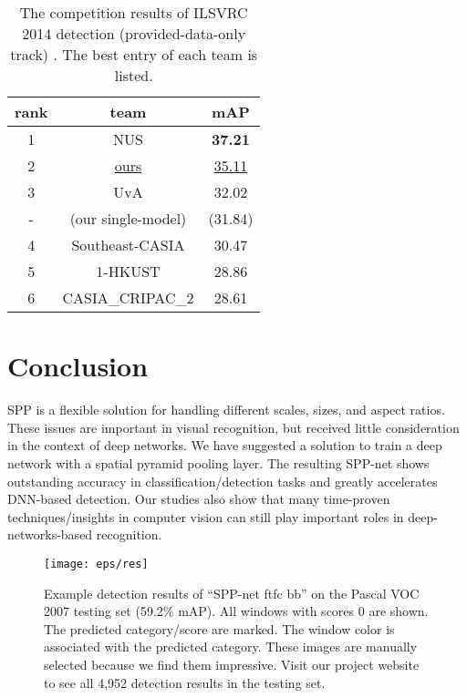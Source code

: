 \documentclass[10pt,journal,cspaper,compsoc]{IEEEtran}
\begin{document}
\setlength{\tabcolsep}{8pt}
\begin{table}[t]
\footnotesize
\begin{center}
\begin{tabular}{cc|c}
\hline
rank & team & mAP\\
\hline
1 &  NUS & \textbf{37.21}\\
2 & \underline{ours} & \underline{35.11}\\
3 & UvA & 32.02\\
- & (our single-model) & (31.84)\\
4 & Southeast-CASIA & 30.47\\
5 & 1-HKUST & 28.86\\
6 & CASIA\_CRIPAC\_2 & 28.61\\
\hline
\end{tabular}
\caption{The competition results of ILSVRC 2014 detection (provided-data-only track) \cite{Russakovsky2014}. The best entry of each team is listed.}
\label{tab:ilsvrc14_DET}
\end{center}
\end{table}

\renewcommand{\baselinestretch}{0.8}
\section{Conclusion}

SPP is a flexible solution for handling different scales, sizes, and aspect ratios. These issues are important in visual recognition, but received little consideration in the context of deep networks. We have suggested a solution to train a deep network with a spatial pyramid pooling layer. The resulting SPP-net shows outstanding accuracy in classification/detection tasks and greatly accelerates DNN-based detection. Our studies also show that many time-proven techniques/insights in computer vision can still play important roles in deep-networks-based recognition.

\begin{figure*}[t]
\center
\texttt{[image: eps/res]}
\caption{Example detection results of ``SPP-net ftfc bb'' on the Pascal VOC 2007 testing set (59.2\% mAP). All windows with scores  0 are shown. The predicted category/score are marked. The window color is associated with the predicted category. These images are manually selected because we find them impressive. Visit our project website to see all 4,952 detection results in the testing set.}
\label{fig:res}
\end{figure*}
\end{document}
